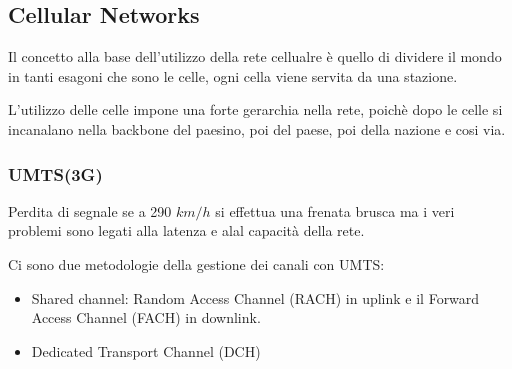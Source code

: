 \subsection{Cellular Networks}

Il concetto alla base dell'utilizzo della rete cellualre \`e quello di dividere il mondo in tanti
esagoni che sono le celle, ogni cella viene servita da una stazione.


L'utilizzo delle celle impone una forte gerarchia nella rete, poich\`e dopo le celle si incanalano
nella backbone del paesino, poi del paese, poi della nazione e cosi via.

\subsubsection{UMTS(3G)}

Perdita di segnale se a 290 $km/h$ si effettua una frenata brusca ma i veri problemi sono legati
alla latenza e alal capacità della rete.

Ci sono due metodologie della gestione dei canali con UMTS:
\begin{itemize}
	\item Shared channel: Random Access Channel (RACH) in uplink e il Forward Access Channel (FACH)
	      in downlink.
	\item Dedicated Transport Channel (DCH)
\end{itemize}

